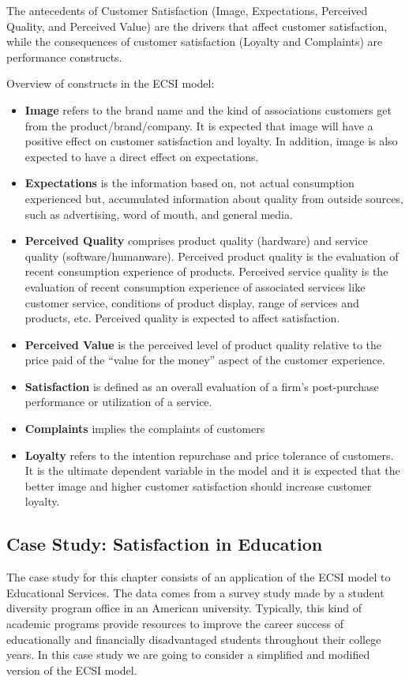 \documentclass[12pt]{book}\usepackage{graphicx, color}
\begin{document}
The antecedents of Customer Satisfaction (Image, Expectations, Perceived Quality, and Perceived Value) are the drivers that affect customer satisfaction, while the consequences of customer satisfaction (Loyalty and Complaints) are performance constructs. 

Overview of constructs in the ECSI model:
\begin{itemize}
 \item \textbf{Image} refers to the brand name and the kind of associations customers get from the product/brand/company. It is expected that image will have a positive effect on customer satisfaction and loyalty. In addition, image is also expected to have a direct effect on expectations.
 \item \textbf{Expectations} is the information based on, not actual consumption experienced but, accumulated information about quality from outside sources, such as advertising, word of mouth, and general media.
 \item \textbf{Perceived Quality} comprises product quality (hardware) and service quality (software/humanware). Perceived product quality is the evaluation of recent consumption experience of products. Perceived service quality is the evaluation of recent consumption experience of associated services like customer service, conditions of product display, range of services and products, etc. Perceived quality is expected to affect satisfaction.
 \item \textbf{Perceived Value} is the perceived level of product quality relative to the price paid of the ``value for the money'' aspect of the customer experience.
 \item \textbf{Satisfaction} is defined as an overall evaluation of a firm's post-purchase performance or utilization of a service.
 \item \textbf{Complaints} implies the complaints of customers
 \item \textbf{Loyalty} refers to the intention repurchase and price tolerance of customers. It is the ultimate dependent variable in the model and it is expected that the better image and higher customer satisfaction should increase customer loyalty.
\end{itemize}

\subsection{Case Study: Satisfaction in Education}
The case study for this chapter consists of an application of the ECSI model to Educational Services. The data comes from a survey study made by a student diversity program office in an American university. Typically, this kind of academic programs provide resources to improve the career success of educationally and financially disadvantaged students throughout their college years. In this case study we are going to consider a simplified and modified version of the ECSI model. 
\end{document}
